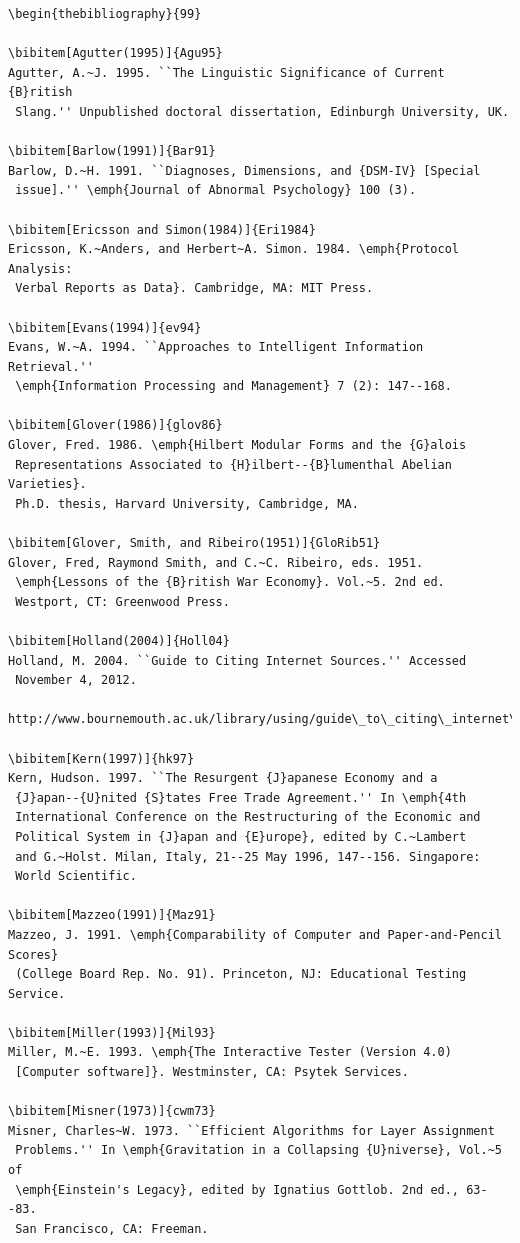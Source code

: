 \documentclass{tPRS2e}
\begin{document}
\begin{verbatim}
\begin{thebibliography}{99}

\bibitem[Agutter(1995)]{Agu95}
Agutter, A.~J. 1995. ``The Linguistic Significance of Current {B}ritish
 Slang.'' Unpublished doctoral dissertation, Edinburgh University, UK.

\bibitem[Barlow(1991)]{Bar91}
Barlow, D.~H. 1991. ``Diagnoses, Dimensions, and {DSM-IV} [Special
 issue].'' \emph{Journal of Abnormal Psychology} 100 (3).

\bibitem[Ericsson and Simon(1984)]{Eri1984}
Ericsson, K.~Anders, and Herbert~A. Simon. 1984. \emph{Protocol Analysis:
 Verbal Reports as Data}. Cambridge, MA: MIT Press.

\bibitem[Evans(1994)]{ev94}
Evans, W.~A. 1994. ``Approaches to Intelligent Information Retrieval.''
 \emph{Information Processing and Management} 7 (2): 147--168.

\bibitem[Glover(1986)]{glov86}
Glover, Fred. 1986. \emph{Hilbert Modular Forms and the {G}alois
 Representations Associated to {H}ilbert--{B}lumenthal Abelian Varieties}.
 Ph.D. thesis, Harvard University, Cambridge, MA.

\bibitem[Glover, Smith, and Ribeiro(1951)]{GloRib51}
Glover, Fred, Raymond Smith, and C.~C. Ribeiro, eds. 1951.
 \emph{Lessons of the {B}ritish War Economy}. Vol.~5. 2nd ed.
 Westport, CT: Greenwood Press.

\bibitem[Holland(2004)]{Holl04}
Holland, M. 2004. ``Guide to Citing Internet Sources.'' Accessed
 November 4, 2012.
 http://www.bournemouth.ac.uk/library/using/guide\_to\_citing\_internet\_sourc.html.

\bibitem[Kern(1997)]{hk97}
Kern, Hudson. 1997. ``The Resurgent {J}apanese Economy and a
 {J}apan--{U}nited {S}tates Free Trade Agreement.'' In \emph{4th
 International Conference on the Restructuring of the Economic and
 Political System in {J}apan and {E}urope}, edited by C.~Lambert
 and G.~Holst. Milan, Italy, 21--25 May 1996, 147--156. Singapore:
 World Scientific.

\bibitem[Mazzeo(1991)]{Maz91}
Mazzeo, J. 1991. \emph{Comparability of Computer and Paper-and-Pencil Scores}
 (College Board Rep. No. 91). Princeton, NJ: Educational Testing Service.

\bibitem[Miller(1993)]{Mil93}
Miller, M.~E. 1993. \emph{The Interactive Tester (Version 4.0)
 [Computer software]}. Westminster, CA: Psytek Services.

\bibitem[Misner(1973)]{cwm73}
Misner, Charles~W. 1973. ``Efficient Algorithms for Layer Assignment
 Problems.'' In \emph{Gravitation in a Collapsing {U}niverse}, Vol.~5 of
 \emph{Einstein's Legacy}, edited by Ignatius Gottlob. 2nd ed., 63--83.
 San Francisco, CA: Freeman.


\end{verbatim}
\end{document}
